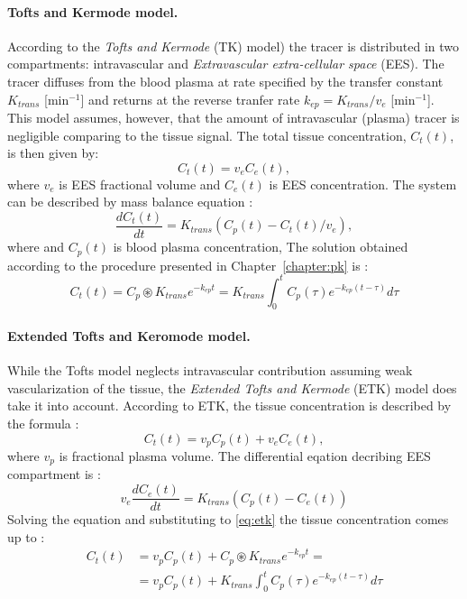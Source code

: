 \paragraph{Tofts and Kermode model.}
According to the \textit{Tofts and Kermode} (TK) model) \cite{tofts1991measurement} the tracer is distributed in two compartments: intravascular and \textit{Extravascular extra-cellular space} (EES).
The tracer diffuses from the blood plasma at rate specified by the transfer constant $K_{trans}$ [min$^{-1}$] and returns at the reverse tranfer rate $k_{ep} = K_{trans}/v_e$ [min$^{-1}$]. This model assumes, however, that the amount of intravascular (plasma) tracer is negligible comparing to the tissue signal. The total tissue concentration, 
\newpage
\noindent $C_t(t)$, is then given by\cite{khalifa2014models}:
\begin{equation}
C_t(t) = v_eC_e(t),
\end{equation}
\noindent where $v_e$ is EES fractional volume and $C_e(t)$ is EES concentration. The system can be described by mass balance equation  \cite{khalifa2014models, tofts1999estimating}: 
\begin{equation}
	\label{eq:toft}
	\frac{dC_{t}(t)}{dt} = K_{trans}(C_p(t)-C_t(t)/v_e),
\end{equation} 
where  and $C_p(t)$ is blood plasma concentration, The solution obtained according to the procedure presented in Chapter~\ref{chapter:pk} is \cite{sourbron2011scope, khalifa2014models}:
\begin{equation}
	\label{eq:toft2}
	C_{t}(t) =C_p\circledast K_{trans}e^{-k_{ep}t} =K_{trans}\int_{0}^{t}C_p(\tau)e^{-k_{ep}(t-\tau)}d\tau  
\end{equation}
\paragraph{Extended Tofts and Keromode model.}
While the Tofts model neglects intravascular contribution assuming weak vascularization of the tissue, the \textit{Extended Tofts and Kermode} (ETK) model \cite{tofts1997modeling} does take it into account. According to ETK, the tissue concentration is described by the formula \cite{tofts2010t1, khalifa2014models}:
\begin{equation}
C_t(t) = v_pC_p(t) + v_eC_e(t),
\label{eq:etk}
\end{equation}
where $v_p$ is fractional plasma volume. The differential eqation decribing EES compartment is \cite{sourbron2011scope}:
\begin{equation}
	\label{eq:etoft}
	v_e\frac{dC_{e}(t)}{dt} = K_{trans}(C_p(t)-C_e(t))
\end{equation}
Solving the equation and substituting to \ref{eq:etk} the tissue concentration comes up to \cite{khalifa2014models, tofts2010t1}:
\begin{align}
	\label{eq:extended_toft}
	C_{t}(t) &=v_pC_p(t) + C_p\circledast K_{trans}e^{-k_{ep}t} =\\
	\nonumber &= v_pC_p(t)+K_{trans}\int_{0}^{t}C_p(\tau)e^{-k_{ep}(t-\tau)}d\tau 
\end{align}



